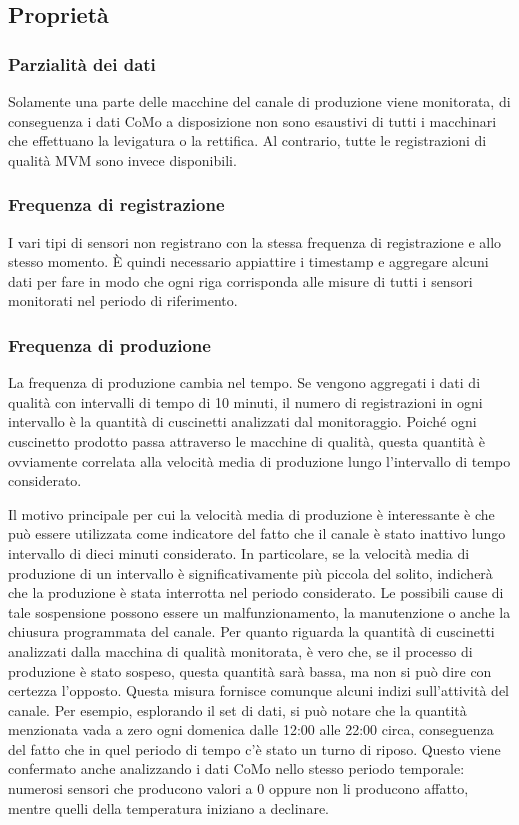\subsection{Proprietà}

\subsubsection{Parzialità dei dati}
Solamente una parte delle macchine del canale di produzione viene monitorata, di conseguenza i dati CoMo a disposizione non sono esaustivi di tutti i macchinari che effettuano la levigatura o la rettifica. Al contrario, tutte le registrazioni di qualità MVM sono invece disponibili.

\subsubsection{Frequenza di registrazione}
I vari tipi di sensori non registrano con la stessa frequenza di registrazione e allo stesso momento.
È quindi necessario appiattire i timestamp e aggregare alcuni dati per fare in modo che ogni riga corrisponda alle misure di tutti i sensori monitorati nel periodo di riferimento.


\subsubsection{Frequenza di produzione}
La frequenza di produzione cambia nel tempo. Se vengono aggregati i dati di qualità con intervalli di tempo di 10 minuti, il numero di registrazioni in ogni intervallo è la quantità di cuscinetti analizzati dal monitoraggio.
Poiché ogni cuscinetto prodotto passa attraverso le macchine di qualità, questa quantità è ovviamente correlata alla velocità media di produzione
lungo l'intervallo di tempo considerato. 

Il motivo principale per cui la velocità media di produzione è interessante è che può essere utilizzata come indicatore del fatto che il canale è stato inattivo lungo intervallo di dieci minuti considerato. In particolare, se la velocità media di produzione di un intervallo è significativamente più piccola del solito, indicherà che la produzione è stata interrotta nel periodo considerato. Le possibili cause di tale sospensione possono essere un malfunzionamento, la manutenzione o anche la chiusura programmata del canale.
Per quanto riguarda la quantità di cuscinetti analizzati dalla macchina di qualità monitorata, è vero che, se il processo di produzione è stato sospeso, questa quantità sarà bassa, ma non si può dire con certezza l'opposto.
Questa misura fornisce comunque alcuni indizi sull'attività del canale. Per esempio, esplorando il set di dati, si può notare che la quantità menzionata vada a zero ogni domenica dalle 12:00 alle 22:00 circa, conseguenza del fatto che in quel periodo di tempo c'è stato un turno di riposo. Questo viene confermato anche analizzando i dati CoMo nello stesso periodo temporale: numerosi sensori che producono valori a 0 oppure non li producono affatto, mentre quelli della temperatura iniziano a declinare. 

